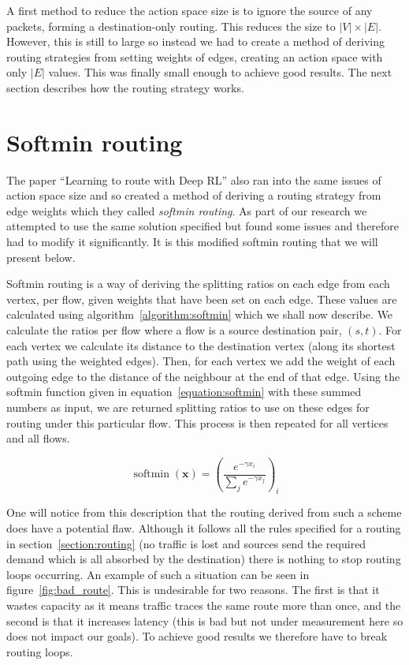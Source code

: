 A first method to reduce the action space size is to ignore the source of any packets, forming a destination-only routing. This reduces the size to $|V|\times|E|$. However, this is still to large so instead we had to create a method of deriving routing strategies from setting weights of edges, creating an action space with only $|E|$ values. This was finally small enough to achieve good results. The next section describes how the routing strategy works.

\section{Softmin routing}
The paper ``Learning to route with Deep RL''\cite{valadarsky2017learning} also ran into the same issues of action space size and so created a method of deriving a routing strategy from edge weights which they called \emph{softmin routing}. As part of our research we attempted to use the same solution specified but found some issues and therefore had to modify it significantly. It is this modified softmin routing that we will present below.

Softmin routing is a way of deriving the splitting ratios on each edge from each vertex, per flow, given weights that have been set on each edge. These values are calculated using algorithm~\ref{algorithm:softmin} which we shall now describe. We calculate the ratios per flow where a flow is a source destination pair, $(s,t)$. For each vertex we calculate its distance to the destination vertex (along its shortest path using the weighted edges). Then, for each vertex we add the weight of each outgoing edge to the distance of the neighbour at the end of that edge. Using the softmin function given in equation~\ref{equation:softmin} with these summed numbers as input, we are returned splitting ratios to use on these edges for routing under this particular flow. This process is then repeated for all vertices and all flows.

\begin{equation}
  \label{equation:softmin}
  \operatorname{softmin}(\bm{x}) = \left(\frac{e^{-\gamma x_i}}{\sum_{j}{e^{-\gamma x_j}}}\right)_i
\end{equation}

One will notice from this description that the routing derived from such a scheme does have a potential flaw. Although it follows all the rules specified for a routing in section~\ref{section:routing} (no traffic is lost and sources send the required demand which is all absorbed by the destination) there is nothing to stop routing loops occurring. An example of such a situation can be seen in figure~\ref{fig:bad_route}. This is undesirable for two reasons. The first is that it wastes capacity as it means traffic traces the same route more than once, and the second is that it increases latency (this is bad but not under measurement here so does not impact our goals). To achieve good results we therefore have to break routing loops.

